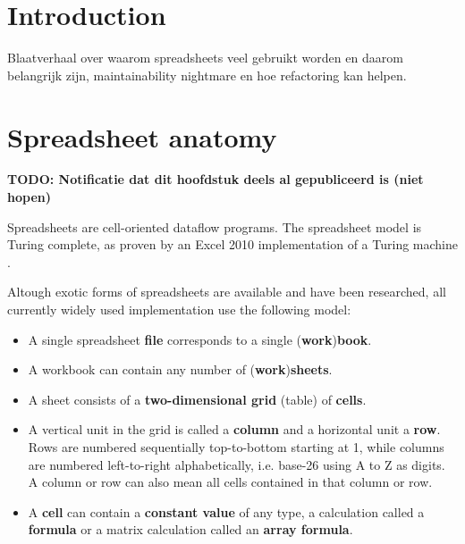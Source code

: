 \documentclass[12pt,a4paper,onecolumn,oneside]{memoir}
\newcommand{\todo}[1]{\textbf{TODO: #1}}
\newcommand{\key}[1]{\textbf{#1}}
\begin{document}


\cleardoublepage

\tableofcontents*

\clearpage


\chapter{Introduction}
Blaatverhaal over waarom spreadsheets veel gebruikt worden en daarom belangrijk zijn, maintainability nightmare en hoe refactoring kan helpen.

\chapter{Spreadsheet anatomy}

\todo{Notificatie dat dit hoofdstuk deels al gepubliceerd is (niet hopen)}

Spreadsheets are cell-oriented dataflow programs.
The spreadsheet model is Turing complete, as proven by an Excel 2010 implementation of a Turing machine \cite{ExcelTuringComplete}.

Altough exotic forms of spreadsheets are available and have been researched, all currently widely used implementation use the following model:
\begin{itemize}
\item A single spreadsheet \key{file} corresponds to a single (\key{work})\key{book}.
\item A workbook can contain any number of (\key{work})\key{sheets}.
\item A sheet consists of a \key{two-dimensional grid} (table) of \key{cells}.
\item A vertical unit in the grid is called a \key{column} and a horizontal unit a \key{row}.
Rows are numbered sequentially top-to-bottom starting at 1, while columns are numbered left-to-right alphabetically, i.e. base-26 using A to Z as digits.
A column or row can also mean all cells contained in that column or row.
\item A \key{cell} can contain a \key{constant value} of any type, a calculation called a \key{formula} or a matrix calculation called an \key{array formula}.
\end{itemize}
\end{document}
